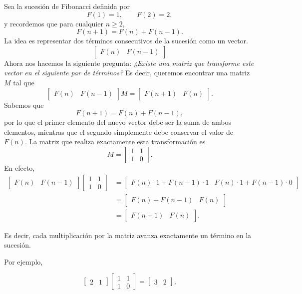 Sea la sucesión de Fibonacci definida por
\[
F(1)=1,\qquad F(2)=2,
\]
y recordemos que para cualquier \(n \ge 2\),
\[
F(n+1)=F(n)+F(n-1).
\]
La idea es representar dos términos consecutivos de la sucesión como un vector.
\[
\begin{bmatrix}
F(n) & F(n-1)
\end{bmatrix}
\]
Ahora nos hacemos la siguiente pregunta:
\textit{¿Existe una matriz que transforme este vector en el siguiente par de términos?}
Es decir, queremos encontrar una matriz \(M\) tal que
\[
\begin{bmatrix}
F(n) & F(n-1)
\end{bmatrix}
M
=
\begin{bmatrix}
F(n+1) & F(n)
\end{bmatrix}.
\]
Sabemos que
\[
F(n+1)=F(n)+F(n-1),
\]
por lo que el primer elemento del nuevo vector debe ser la suma de ambos elementos, mientras que el segundo simplemente debe conservar el valor de \(F(n)\).
La matriz que realiza exactamente esta transformación es
\[
M=
\begin{bmatrix}
1 & 1\\
1 & 0
\end{bmatrix}.
\]
En efecto,
\[
\begin{aligned}
\begin{bmatrix}
F(n) & F(n-1)
\end{bmatrix}
\begin{bmatrix}
1 & 1\\
1 & 0
\end{bmatrix}
&=
\begin{bmatrix}
F(n)\cdot1+F(n-1)\cdot1 &
F(n)\cdot1+F(n-1)\cdot0
\end{bmatrix}
\\[2mm]
&=
\begin{bmatrix}
F(n)+F(n-1) &
F(n)
\end{bmatrix}
\\[2mm]
&=
\begin{bmatrix}
F(n+1) &
F(n)
\end{bmatrix}.
\end{aligned}
\]

Es decir, cada multiplicación por la matriz avanza exactamente un término en la sucesión.

Por ejemplo,

\[
\begin{bmatrix}
2 & 1
\end{bmatrix}
\begin{bmatrix}
1 & 1\\
1 & 0
\end{bmatrix}
=
\begin{bmatrix}
3 & 2
\end{bmatrix},
\]

